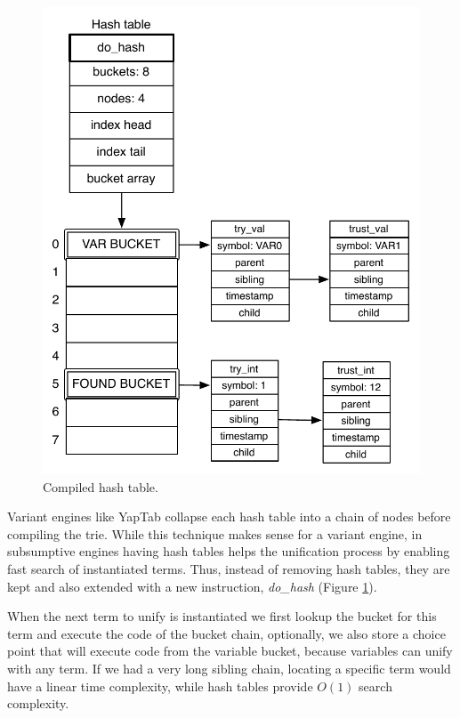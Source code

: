 \begin{figure}[H]
  \centering
    \includegraphics[scale=0.6]{compiled_hash.pdf}
  \caption{Compiled hash table.}
  \label{fig:compiled_hash}
\end{figure}

Variant engines like YapTab collapse each hash table into a chain of nodes before compiling
the trie. While this technique makes sense for a variant engine, in subsumptive engines
having hash tables helps the unification process by enabling fast search of instantiated terms.
Thus, instead of removing hash tables, they are kept and also extended with a new instruction,
\textit{do\_hash} (Figure \ref{fig:compiled_hash}).

When the next term to unify is instantiated we first lookup the bucket for this
term and execute the code of the bucket chain, optionally, we also store a choice point that will
execute code from the variable bucket, because variables can unify with any term. If we had
a very long sibling chain, locating a specific term would have a linear time complexity, while
hash tables provide $O(1)$ search complexity.

